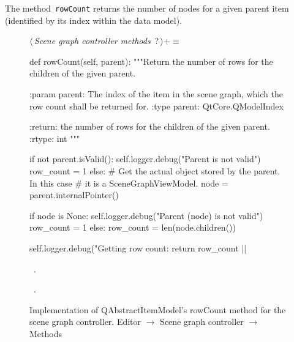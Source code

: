 \documentclass[%
    a4paper,    %
    justified,  %
    nobib,      %
    openany     %
]{tufte-book}
\begin{document}
The method~\verb=rowCount= returns the number of nodes for a given parent
item (identified by its index within the data model).

\begin{figure}
\begin{flushleft} \small
\begin{minipage}{\linewidth}\label{scrap34}\raggedright\small
{} $\langle\,${\itshape Scene graph controller methods}\nobreak\ {\footnotesize {?}}$\,\rangle+\equiv$
\vspace{-1ex}
\begin{pythoncode}
def rowCount(self, parent):
    """Return the number of rows for the children of the given
    parent.

    :param parent: The index of the item in the scene graph, which
                   the row count shall be returned for.
    :type  parent: QtCore.QModelIndex

    :return: the number of rows for the children of the given
             parent.
    :rtype:  int
    """

    if not parent.isValid():
        self.logger.debug("Parent is not valid")
        row_count = 1
    else:
        # Get the actual object stored by the parent. In this case
        # it is a SceneGraphViewModel.
        node = parent.internalPointer()

        if node is None:
            self.logger.debug("Parent (node) is not valid")
            row_count = 1
        else:
            row_count = len(node.children())

    self.logger.debug("Getting row count: %
    return row_count
|\NWsep|
\end{pythoncode}
\vspace{1.5ex}
\footnotesize
\begin{list}{}{\setlength{\itemsep}{-\parsep}\setlength{\itemindent}{-\leftmargin}}
\item \NWtxtMacroDefBy\ .
\item \NWtxtMacroRefIn\ .

\item{}
\end{list}
\end{minipage}\vspace{4ex}
\end{flushleft}
\caption{Implementation of QAbstractItemModel's rowCount method for the scene
  graph controller.
  \newline{}\newline{}Editor $\rightarrow$ Scene graph controller $\rightarrow$
  Methods}
\label{editor:lst:scene-graph-controller:methods:row-count}
\end{figure}
\end{document}
